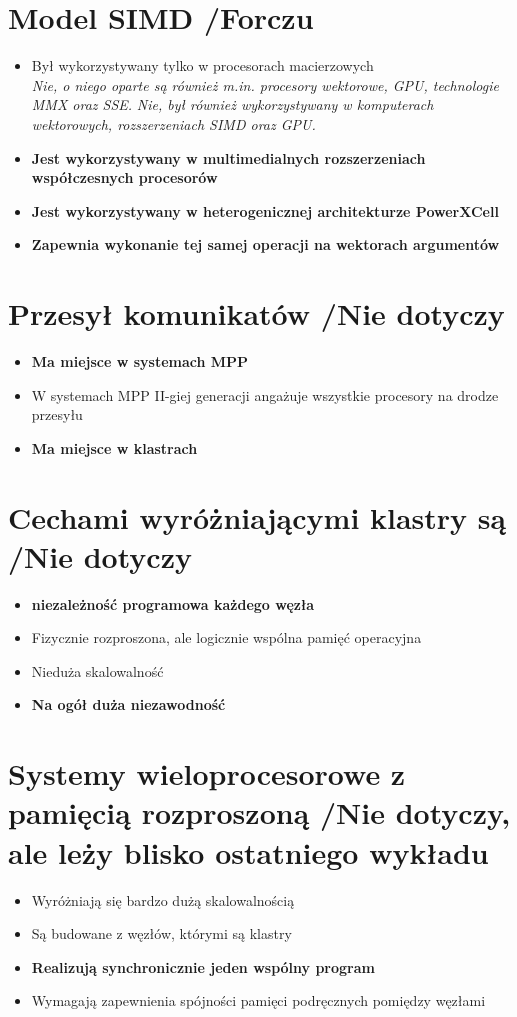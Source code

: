 \documentclass[a4paper,twoside]{article}
\begin{document}
\section{Model SIMD  {\small /Forczu}}
	\begin{itemize}
    \item Był wykorzystywany tylko w procesorach macierzowych\\
    {\small \emph{Nie, o niego oparte są również m.in. procesory wektorowe, GPU, technologie MMX oraz SSE.}}
    {\small \emph{Nie, był również wykorzystywany w komputerach wektorowych, rozszerzeniach SIMD oraz GPU.}}
    \item \textbf{Jest wykorzystywany w multimedialnych rozszerzeniach współczesnych procesorów}
    \item \textbf{Jest wykorzystywany w heterogenicznej architekturze PowerXCell}
    \item \textbf{Zapewnia wykonanie tej samej operacji na wektorach argumentów}
    \end{itemize}

\section{Przesył komunikatów {\small /Nie dotyczy}}
	\begin{itemize}
    \item \textbf{Ma miejsce w systemach MPP}
    \item W systemach MPP II-giej generacji angażuje wszystkie procesory na drodze przesyłu
    \item \textbf{Ma miejsce w klastrach}
    \end{itemize}

\section{Cechami wyróżniającymi klastry są {\small /Nie dotyczy}}
	\begin{itemize}
    \item \textbf{niezależność programowa każdego węzła}
    \item Fizycznie rozproszona, ale logicznie wspólna pamięć operacyjna
    \item Nieduża skalowalność
    \item \textbf{Na ogół duża niezawodność}
    \end{itemize}

\section{Systemy wieloprocesorowe z pamięcią rozproszoną {\small /Nie dotyczy, ale leży blisko ostatniego wykładu}}
	\begin{itemize}
    \item Wyróżniają się bardzo dużą skalowalnością
    \item Są budowane z węzłów, którymi są klastry
    \item \textbf{Realizują synchronicznie jeden wspólny program}
    \item Wymagają zapewnienia spójności pamięci podręcznych pomiędzy węzłami
    \end{itemize}
\end{document}

